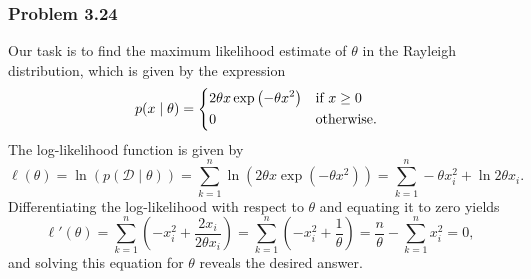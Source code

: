 \documentclass[12pt, a4paper]{article}
\newcommand{\D}{\mathcal{D}}
\begin{document}
\subsubsection*{Problem 3.24}
Our task is to find the maximum likelihood estimate of $\theta$ in the Rayleigh distribution, which is given by the expression
\begin{equation*}
	p (x  \mid  \theta) = 
	\begin{dcases*}
	2 \theta x \exp \left( -\theta x^2 \right) & if $x \geq 0$ \\
	0 & otherwise.
	\end{dcases*}
\end{equation*}
The log-likelihood function is given by
\begin{equation*}
	\ell(\theta)= \ln \left( p (\D  \mid  \theta) \right) 
	= 
	\sum_{k=1}^{n} \ln \left( 2 \theta x \exp \left( -\theta x^2 \right) \right)
	= 
	\sum_{k=1}^{n} - \theta x_i^2 + \ln 2 \theta x_i.
\end{equation*}
Differentiating the log-likelihood with respect to $\theta$ and equating it to zero yields
\begin{equation*}
	\ell'(\theta) =
	\sum_{k=1}^{n} \left(-  x_i^2 + \frac{2 x_i}{2 \theta x_i}\right)
	=
	\sum_{k=1}^{n} \left(-  x_i^2 + \frac{1}{\theta}\right)
	=
	\frac{n}{\theta} - \sum_{k=1}^{n}  x_i^2 
	= 0,
\end{equation*}
and solving this equation for $\theta$ reveals the desired answer.
\end{document}

